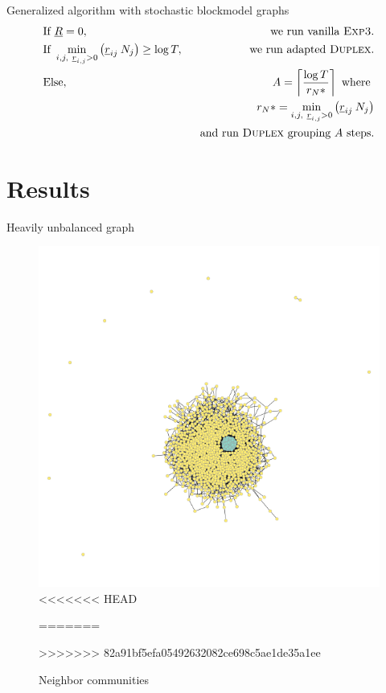 \documentclass[11pt]{beamer}
\begin{document}
\begin{frame}{Generalized algorithm with stochastic blockmodel graphs}
\begin{align*}
&\text{If }\underline{R}=0,\ & \text{ we run vanilla } \textsc{Exp3}.\\
&\text{If } \min_{i,j,\ \underline{r}_{i,j}>0} \left(\underline{r}_{ij}\: N_j \right) \geq \log T ,\  & \text{ we run adapted }\textsc{Duplex}. \\
&\text{Else},\ & A =\left\lceil \frac{\log T}{r_N*} \right\rceil \text{ where }\\
& & r_N*=\min_{i,j,\ \underline{r}_{i,j}>0} \left(\underline{r}_{ij}\: N_j \right) \\
& & \text{ and run } \textsc{Duplex} \text{ grouping } A \text{ steps}.  
\end{align*}
\end{frame}

\section{Results}

\begin{frame}{Heavily unbalanced graph}
\begin{figure}[ht]
	\centering
	\includegraphics[width=.6\textwidth]{blockmodel_success}
<<<<<<< HEAD
	\caption{Graph (at one $t$)}
=======
	\caption{Neighbor communities}
>>>>>>> 82a91bf5efa05492632082ce698c5ae1de35a1ee
\end{figure}
\end{frame}
\end{document}
